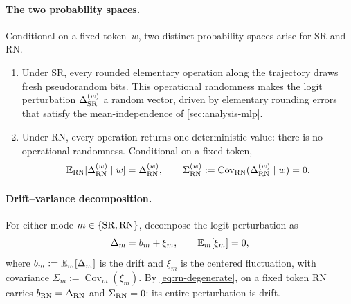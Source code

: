 \paragraph{The two probability spaces.}
Conditional on a fixed token~$w$, two distinct probability spaces arise for SR
and RN.
\begin{enumerate}[leftmargin=1.7em,label=(\roman*)]
  \item Under SR, every rounded elementary operation along the trajectory draws
        fresh pseudorandom bits. This operational randomness makes the
        logit perturbation $\Delta_{\mathrm{SR}}^{(w)}$ a random vector, driven by
        elementary rounding errors that satisfy the mean-independence of \cref{sec:analysis-mlp}.

  \item Under RN, every operation returns one deterministic value: there is no
        operational randomness. Conditional on a fixed token,
        \begin{equation}
          \mathbb{E}_{\mathrm{RN}}[\Delta_{\mathrm{RN}}^{(w)}\mid w]=\Delta_{\mathrm{RN}}^{(w)},
          \qquad
          \Sigma_{\mathrm{RN}}^{(w)}:=\operatorname{Cov}_{\mathrm{RN}}(\Delta_{\mathrm{RN}}^{(w)}\mid w)=0.
          \label{eq:rn-degenerate}
        \end{equation}
\end{enumerate}

\paragraph{Drift--variance decomposition.}
For either mode $m\in\{\mathrm{SR},\mathrm{RN}\}$, decompose the logit perturbation as
\begin{equation}
  \Delta_m=b_m+\xi_m,
  \qquad
  \mathbb{E}_m[\xi_m]=0,
  \label{eq:local-bias-cov}
\end{equation}
where $b_m:=\mathbb{E}_m[\Delta_m]$ is the drift and $\xi_m$ is the centered
fluctuation, with covariance $\Sigma_m:=\operatorname{Cov}_m(\xi_m)$.
By \cref{eq:rn-degenerate}, on a fixed token RN carries
$b_{\mathrm{RN}}=\Delta_{\mathrm{RN}}$ and $\Sigma_{\mathrm{RN}}=0$: its entire perturbation is
drift.


